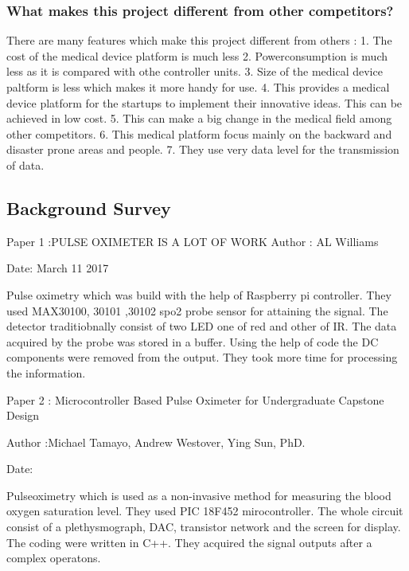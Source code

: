 
\subsubsection{What makes this project different from other competitors?}

There are many features which make this project different from others :
1. The cost of the medical device platform is much less
2. Powerconsumption is much less as it is compared with othe controller units.
3. Size of the medical device paltform is less which makes it more handy for use.
4. This provides a medical device platform for the startups to implement their innovative ideas. This can be achieved in low cost.
5. This can make a big change in the medical field among other competitors.
6. This medical platform focus mainly on the backward and disaster prone areas and people.
7. They use very data level for the transmission of data.   


\subsection{Background Survey}

Paper 1 :PULSE OXIMETER IS A LOT OF WORK \cite{HACKADAY}
Author  : AL Williams  

Date: March 11 2017 
 
Pulse oximetry which was build with the help of Raspberry pi controller. 
They used MAX30100, 30101 ,30102  spo2 probe sensor for attaining the signal. 
The detector traditiobnally consist of two LED one of red and other of IR. 
The data acquired by the probe was stored in a buffer. 
Using the help of code the DC components were removed from the output. 
They took more time for processing the information. 

Paper 2 :  Microcontroller Based Pulse Oximeter for Undergraduate Capstone Design \cite{tamayo2010microcontroller}

Author  :Michael Tamayo, Andrew Westover, Ying Sun, PhD.

Date: 

Pulseoximetry which is used as a non-invasive method for measuring the blood oxygen saturation level. 
They used PIC 18F452  mirocontroller. The whole circuit consist of a plethysmograph, DAC, transistor network and the screen for display. 
The coding were written in C++.
They acquired the signal outputs after a complex operatons.  

